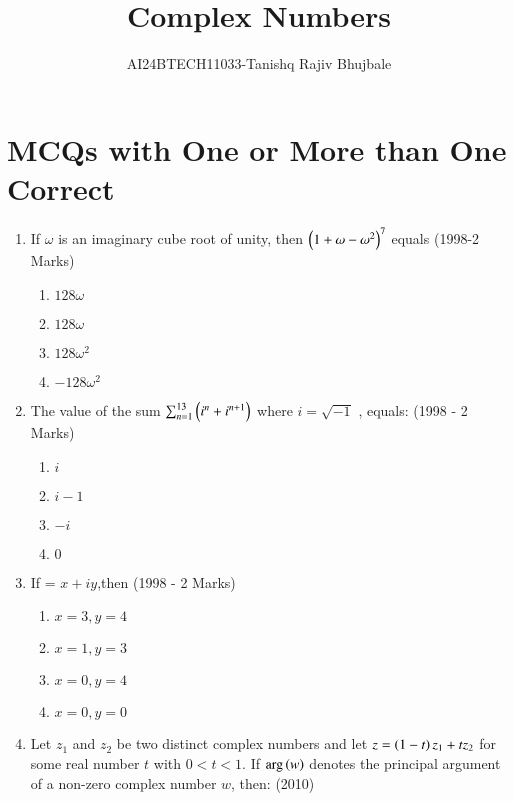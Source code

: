 \documentclass[journal,12pt, onecolumn]{IEEEtran}
\theoremstyle{remark}
\begin{document}

\vspace{3cm}
\title{Complex Numbers}
\author{AI24BTECH11033-Tanishq Rajiv Bhujbale}
\maketitle
\bigskip

\renewcommand{\thefigure}{\theenumi}
\renewcommand{\thetable}{\theenumi}

\section{MCQs with One or More than One Correct}
\begin{enumerate}
    \item If $\omega$ is an imaginary cube root of unity, then 
    $\left(1+\omega-\omega^2\right)^7$ equals \hfill (1998-2 Marks)
    \begin{enumerate}
    \item $128\omega$    
    \item $128\omega$
    \item $128\omega^2$
    \item $-128\omega^2$
    \end{enumerate}
    \item The value of the sum 
   $\sum_{n=1}^{13} \left(i^n+i^{n+1}\right)$
where  $i=\sqrt{-1}$ , equals: \hfill (1998 - 2 Marks)
\begin{multicols}{4}
    \begin{enumerate}
    \item $i$
    \item $i - 1$
    \item $-i$
    \item $0$
    \end{enumerate}
\end{multicols}
    \item If = $x+iy$,then \hfill (1998 - 2 Marks)
\begin{enumerate}
    \item $x=3,y=4$    
    \item $x=1,y=3$ 
    \item $x=0,y=4$
    \item $x=0,y=0$
    \end{enumerate}
    \item Let $z_1$ and $z_2$ be two distinct complex numbers and let $z= \left(1-t\right)z_1+tz_2$ for some real number $t$ with $0<t<1$. If $\mathrm{arg}\left(w\right)$ denotes the principal argument of a non-zero complex number $w$, then: \hfill (2010)

\end{enumerate}
\end{document}
